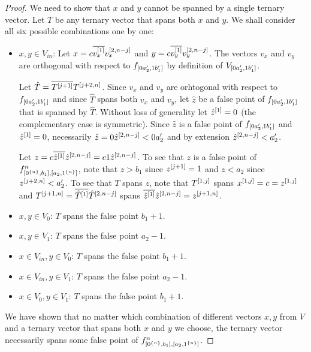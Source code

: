 \begin{proof}
We need to show that $x$ and $y$
cannot be spanned by a single ternary vector.
Let $T$ be any ternary vector that spans both $x$ and $y$.
We shall consider all six possible combinations
one by one:
\begin{itemize}
\item $x,y \in V_{in}$:
Let $x = c \overline{v_x^{[1]}} v_x^{[2, n-j]}$
and $y = c \overline{v_y^{[1]}} v_y^{[2, n-j]}$.
The vectors $v_x$ and $v_y$ are orthogonal with respect to $f_{[0 a_2', 1 b_1']}$
by definition of $V_{[0 a_2', 1 b_1']}$.

Let $\hat{T} = \overline{T^{[j+1]}} T^{[j+2, n]}$.
Since $v_x$ and $v_y$ are orhtogonal with respect to
$f_{[0 a_2', 1 b_1']}$
and since $\hat{T}$ spans both $v_x$ and $v_y$,
let $\hat{z}$ be a false point
of $f_{[0 a_2', 1 b_1']}$
that is spanned by $\hat{T}$.
Without loss of generality let $\hat{z}^{[1]} = 0$
(the complementary case is symmetric).
Since $\hat{z}$ is a false point
of $f_{[0 a_2', 1 b_1']}$
and $\hat{z}^{[1]} = 0$,
necessarily
$\hat{z} = 0 \hat{z}^{[2, n-j]} < 0 a_2'$
and by extension
$\hat{z}^{[2, n-j]} < a_2'$.

Let $z
= c \overline{\hat{z}^{[1]}} \hat{z}^{[2, n-j]}
= c 1 \hat{z}^{[2, n-j]}$.
To see that $z$ is a false point of $f^{n}_{[0^{\{n\}}, b_1], [a_2, 1^{\{n\}}]}$,
note that $z > b_1$ since $z^{[j+1]} = 1$
and $z < a_2$ since $z^{[j+2, n]} < a_2'$.
To see that $T$ spans $z$,
note that
$T^{[1, j]}$ spans
$x^{[1, j]} = c = z^{[1, j]}$
and $T^{[j+1, n]} = \overline{\hat{T}^{[1]}} \hat{T}^{[2, n-j]}$ spans $\overline{\hat{z}^{[1]}} \hat{z}^{[2, n-j]} = z^{[j+1, n]}$.
\item $x,y \in V_0$:
$T$ spans the false point $b_1 + 1$.
\item $x,y \in V_1$:
$T$ spans the false point $a_2 - 1$.
\item $x \in V_{in}, y \in V_0$:
$T$ spans the false point $b_1 + 1$.
\item $x \in V_{in}, y \in V_1$:
$T$ spans the false point $a_2 - 1$.
\item $x \in V_0, y \in V_1$:
$T$ spans the false point $b_1 + 1$.
\end{itemize}

We have shown that no matter which combination
of different vectors $x, y$ from $V$
and a ternary vector that spans both $x$ and $y$
we choose,
the ternary vector necessarily spans some false point
of $f^{n}_{[0^{\{n\}}, b_1], [a_2, 1^{\{n\}}]}$.
\end{proof}

